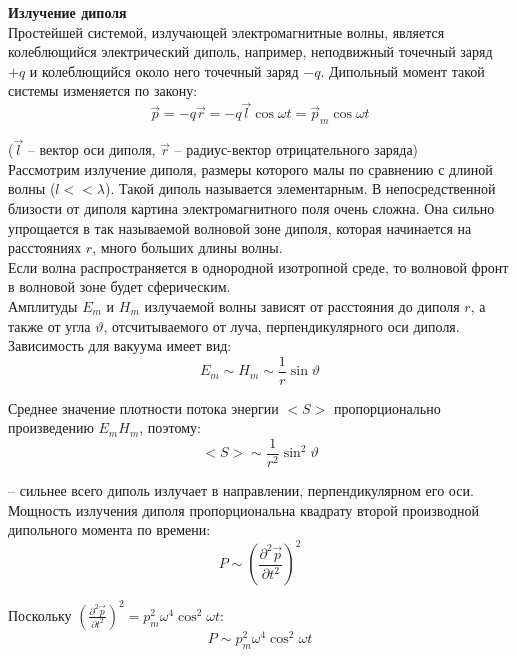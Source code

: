 \documentclass{article}
\begin{document}
	
	\textbf{Излучение диполя}\\

	Простейшей системой, излучающей электромагнитные волны, является колеблющийся электрический диполь, например, неподвижный точечный заряд $+q$ и колеблющийся около него точечный заряд $-q$. Дипольный момент такой системы изменяется по закону:
	\begin{equation}
		\vec p = -q\vec r = -q\vec l\cos\omega t = \vec p_m\cos\omega t
	\end{equation}

	($\vec l$ -- вектор оси диполя, $\vec r$ -- радиус-вектор отрицательного заряда)\\

	Рассмотрим излучение диполя, размеры которого малы по сравнению с длиной волны ($l << \lambda$). Такой диполь называется элементарным. В непосредственной близости от диполя картина электромагнитного поля очень сложна. Она сильно упрощается в так называемой волновой зоне диполя, которая начинается на расстояниях $r$, много больших длины волны.\\

	Если волна распространяется в однородной изотропной среде, то волновой фронт в волновой зоне будет сферическим.\\

	Амплитуды $E_m$ и $H_m$ излучаемой волны зависят от расстояния до диполя $r$, а также от угла $\vartheta$, отсчитываемого от луча, перпендикулярного оси диполя. Зависимость для вакуума имеет вид:
	\begin{equation}
		E_m \sim H_m \sim \frac{1}{r}\sin\vartheta
	\end{equation}

	Среднее значение плотности потока энергии $<S>$ пропорционально произведению $E_mH_m$, поэтому:
	\begin{equation}
		<S>\sim\frac{1}{r^2}\sin^2\vartheta
	\end{equation}

	-- сильнее всего диполь излучает в направлении, перпендикулярном его оси.\\

	Мощность излучения диполя пропорциональна квадрату второй производной дипольного момента по времени:
	\begin{equation}
		P\sim (\frac{\partial^2\vec p}{\partial t^2})^2
	\end{equation}

	Поскольку $(\frac{\partial^2\vec p}{\partial t^2})^2 = p_m^2\omega^4\cos^2\omega t$:
	\begin{equation}
		P\sim p_m^2\omega^4\cos^2\omega t
	\end{equation}
\end{document}
